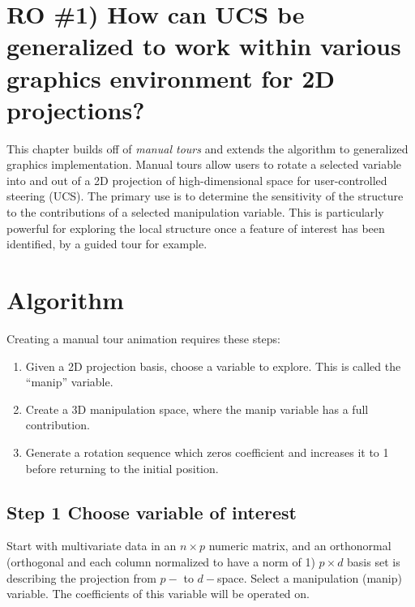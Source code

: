 \documentclass{monashthesis}
\begin{document}
\section{RO \#1) How can UCS be generalized to work within various
graphics environment for 2D
projections?}\label{ro-1-how-can-ucs-be-generalized-to-work-within-various-graphics-environment-for-2d-projections}

This chapter builds off of \emph{manual tours}
\autocite{cook_manual_1997} and extends the algorithm to generalized
graphics implementation. Manual tours allow users to rotate a selected
variable into and out of a 2D projection of high-dimensional space for
user-controlled steering (UCS). The primary use is to determine the
sensitivity of the structure to the contributions of a selected
manipulation variable. This is particularly powerful for exploring the
local structure once a feature of interest has been identified, by a
guided tour for example.

\section{Algorithm}\label{sec:algorithm}

Creating a manual tour animation requires these steps:

\begin{enumerate}
\def\labelenumi{\arabic{enumi}.}
\tightlist
\item
  Given a 2D projection basis, choose a variable to explore. This is
  called the ``manip'' variable.
\item
  Create a 3D manipulation space, where the manip variable has a full
  contribution.
\item
  Generate a rotation sequence which zeros coefficient and increases it
  to 1 before returning to the initial position.
\end{enumerate}

\subsection{Step 1 Choose variable of
interest}\label{step-1-choose-variable-of-interest}

Start with multivariate data in an \(n \times p\) numeric matrix, and an
orthonormal (orthogonal and each column normalized to have a norm of 1)
\(p \times d\) basis set is describing the projection from \(p-\) to
\(d-\)space. Select a manipulation (manip) variable. The coefficients of
this variable will be operated on.
\end{document}
